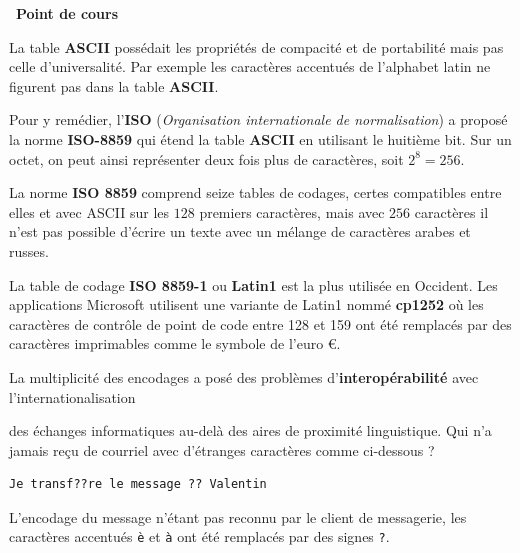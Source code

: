 \documentclass[a4paper, french, 12pt]{article}  %
\newcounter{prop}
\newcounter{cours}
\newenvironment{cours}[1]
{\par \medskip   \addtocounter{cours}{1} \noindent  
\begin{bclogo}[arrondi =0.1,  ombre = true, barre=none, logo=\bcbook, marge=4]{~\textbf{Point de cours} \textbf{\thecours} {\itshape #1} }  \par}
{
\end{bclogo}
 \par \bigskip }
\begin{document}
\begin{cours}{}
La table \textbf{ASCII} possédait les propriétés de compacité et de portabilité mais pas celle d'universalité. Par exemple les caractères accentués de l'alphabet latin ne figurent pas  dans la table \textbf{ASCII}.

Pour y remédier, l'\textbf{ISO} (\textit{Organisation internationale de normalisation}) a proposé la norme \textbf{ISO-8859} qui   étend la table \textbf{ASCII} en utilisant le huitième bit. Sur un octet, on peut ainsi représenter deux fois plus de caractères, soit $2^{8}=256$. 

La norme \textbf{ISO 8859} comprend seize tables de codages, certes compatibles entre elles et avec ASCII sur les $128$ premiers caractères, mais avec $256$ caractères il n'est pas possible d'écrire un texte avec un mélange de caractères arabes et russes. 

La table de codage \textbf{ISO 8859-1}  ou \textbf{Latin1} est la plus utilisée en Occident. Les applications Microsoft utilisent une variante de Latin1 nommé \textbf{cp1252} où les caractères de contrôle de point de code entre 128 et 159 ont été remplacés par des caractères imprimables comme le symbole de l'euro €.  

La multiplicité des encodages a posé des problèmes d'\textbf{interopérabilité} avec l'internationalisation

des échanges informatiques au-delà des aires de proximité linguistique. Qui  n'a jamais reçu de courriel avec d'étranges caractères comme ci-dessous ?

\begin{lstlisting}[style=compil]
Je transf??re le message ?? Valentin
\end{lstlisting}

L'encodage du message n'étant pas reconnu par le client de messagerie, les caractères accentués \texttt{è} et \texttt{à} ont été remplacés par des signes \texttt{?}.
\end{cours}

\vspace*{-20pt}
\end{document}
